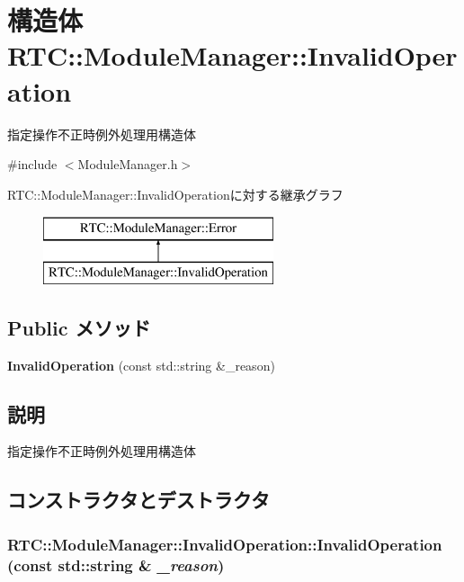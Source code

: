\section{構造体 RTC::ModuleManager::InvalidOperation}
\label{structRTC_1_1ModuleManager_1_1InvalidOperation}


指定操作不正時例外処理用構造体  




{\ttfamily \#include $<$ModuleManager.h$>$}

RTC::ModuleManager::InvalidOperationに対する継承グラフ\begin{figure}[H]
\begin{center}
\leavevmode
\includegraphics[height=2cm]{structRTC_1_1ModuleManager_1_1InvalidOperation}
\end{center}
\end{figure}
\subsection*{Public メソッド}
\begin{DoxyCompactItemize}
\item 
{\bf InvalidOperation} (const std::string \&\_\-reason)
\end{DoxyCompactItemize}


\subsection{説明}
指定操作不正時例外処理用構造体 

\subsection{コンストラクタとデストラクタ}
\subsubsection[{InvalidOperation}]{\setlength{\rightskip}{0pt plus 5cm}RTC::ModuleManager::InvalidOperation::InvalidOperation (const std::string \& {\em \_\-reason})\hspace{0.3cm}{\ttfamily  [inline]}}\label{structRTC_1_1ModuleManager_1_1InvalidOperation_a49b14ed508206f3f05a14bcc5811de4a}
